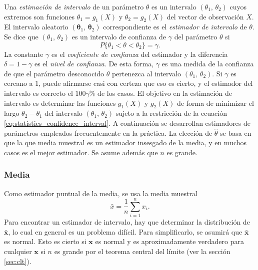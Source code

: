 \documentclass[a4paper]{report}
\newcommand{\x}{\mathbf{x}}
\newcommand{\thetabf}{\bm{\theta}}
\begin{document}
Una \emph{estimación de intervalo} de un parámetro \(\theta\) es un intervalo \((\theta_1,\,\theta_2)\) cuyos extremos son funciones \(\theta_1=g_1(X)\) y \(\theta_2=g_2(X)\) del vector de observación \(X\). El intervalo aleatorio \((\thetabf_1,\,\thetabf_2)\) correspondiente es el \emph{estimador de intervalo} de \(\theta\). Se dice que \((\theta_1,\,\theta_2)\) es un intervalo de confianza de \(\gamma\) del parámetro \(\theta\) si
\begin{equation}\label{eq:statistics_confidence_interval}
  P\{\theta_1<\theta<\theta_2\}=\gamma.
\end{equation}
La constante \(\gamma\) es el \emph{coeficiente de confianza} del estimador y la diferencia \(\delta=1-\gamma\) es el \emph{nivel de confianza}. De esta forma, \(\gamma\) es una medida de la confianza de que el parámetro desconocido \(\theta\) pertenezca al intervalo \((\theta_1,\,\theta_2)\). Si \(\gamma\) es cercano a 1, puede afirmarse casi con certeza que eso es cierto, y el estimador del intervalo es correcto el \(100\gamma\%\) de los casos. El objetivo en la estimación de intervalo es determinar las funciones \(g_1(X)\) y \(g_2(X)\) de forma de minimizar el largo \(\theta_2-\theta_1\) del intervalo \((\theta_1,\,\theta_2)\) sujeto a la restricción de la ecuación \ref{eq:statistics_confidence_interval}. A continuación se desarrollan estimadores de parámetros empleados frecuentemente en la práctica. La elección de \(\hat{\theta}\) se basa en que la que media muestral es un estimador insesgado de la media, y en muchos casos es el mejor estimador. Se asume además que \(n\) es grande.

\subsubsection{Media}

Como estimador puntual de la media, se usa la media muestral
\[
 \bar{x}=\frac{1}{n}\sum_{i=1}^nx_i.
\]
Para encontrar un estimador de intervalo, hay que determinar la distribución de \(\bar{\x}\), lo cual en general es un problema difícil. Para simplificarlo, se asumirá que \(\bar{\x}\) es normal. Esto es cierto si \(\x\) es normal y es aproximadamente verdadero para cualquier \(\x\) si \(n\) es grande por el teorema central del límite (ver la sección \ref{sec:clt}).
\end{document}

